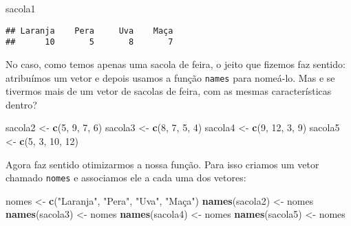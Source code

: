 \documentclass[]{book}
\newenvironment{Shaded}{\begin{snugshade}}{\end{snugshade}}
\newcommand{\DecValTok}[1]{\textcolor[rgb]{0.00,0.00,0.81}{#1}}
\newcommand{\KeywordTok}[1]{\textcolor[rgb]{0.13,0.29,0.53}{\textbf{#1}}}
\newcommand{\NormalTok}[1]{#1}
\newcommand{\StringTok}[1]{\textcolor[rgb]{0.31,0.60,0.02}{#1}}
\theoremstyle{definition}
\theoremstyle{definition}
\theoremstyle{definition}
\theoremstyle{remark}
\begin{document}
\begin{Shaded}
\begin{Highlighting}[]
\NormalTok{sacola1}
\end{Highlighting}
\end{Shaded}

\begin{verbatim}
## Laranja    Pera     Uva    Maça 
##      10       5       8       7
\end{verbatim}

No caso, como temos apenas uma sacola de feira, o jeito que fizemos faz sentido: atribuímos um vetor e depois usamos a função \texttt{names} para nomeá-lo. Mas e se tivermos mais de um vetor de sacolas de feira, com as mesmas características dentro?

\begin{Shaded}
\begin{Highlighting}[]
\NormalTok{sacola2 <-}\StringTok{ }\KeywordTok{c}\NormalTok{(}\DecValTok{5}\NormalTok{, }\DecValTok{9}\NormalTok{, }\DecValTok{7}\NormalTok{, }\DecValTok{6}\NormalTok{)}
\NormalTok{sacola3 <-}\StringTok{ }\KeywordTok{c}\NormalTok{(}\DecValTok{8}\NormalTok{, }\DecValTok{7}\NormalTok{, }\DecValTok{5}\NormalTok{, }\DecValTok{4}\NormalTok{)}
\NormalTok{sacola4 <-}\StringTok{ }\KeywordTok{c}\NormalTok{(}\DecValTok{9}\NormalTok{, }\DecValTok{12}\NormalTok{, }\DecValTok{3}\NormalTok{, }\DecValTok{9}\NormalTok{)}
\NormalTok{sacola5 <-}\StringTok{ }\KeywordTok{c}\NormalTok{(}\DecValTok{5}\NormalTok{, }\DecValTok{3}\NormalTok{, }\DecValTok{10}\NormalTok{, }\DecValTok{12}\NormalTok{)}
\end{Highlighting}
\end{Shaded}

Agora faz sentido otimizarmos a nossa função. Para isso criamos um vetor chamado \texttt{nomes} e associamos ele a cada uma dos vetores:

\begin{Shaded}
\begin{Highlighting}[]
\NormalTok{nomes <-}\StringTok{ }\KeywordTok{c}\NormalTok{(}\StringTok{"Laranja"}\NormalTok{, }\StringTok{"Pera"}\NormalTok{, }\StringTok{"Uva"}\NormalTok{, }\StringTok{"Maça"}\NormalTok{)}
\KeywordTok{names}\NormalTok{(sacola2) <-}\StringTok{ }\NormalTok{nomes}
\KeywordTok{names}\NormalTok{(sacola3) <-}\StringTok{ }\NormalTok{nomes}
\KeywordTok{names}\NormalTok{(sacola4) <-}\StringTok{ }\NormalTok{nomes}
\KeywordTok{names}\NormalTok{(sacola5) <-}\StringTok{ }\NormalTok{nomes}
\end{Highlighting}
\end{Shaded}
\end{document}
